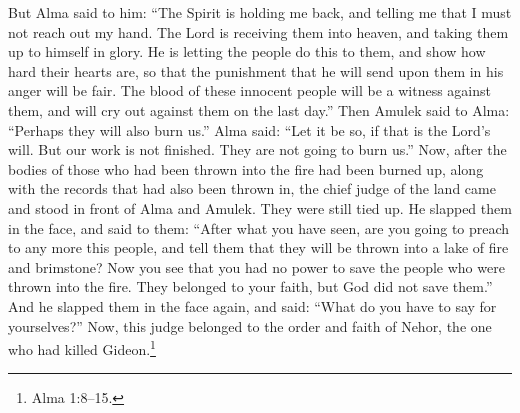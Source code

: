 But Alma said to him: ``The Spirit is holding me back, and telling me that I must not reach out my hand. The Lord is receiving them into heaven, and taking them up to himself in glory. He is letting the people do this to them, and show how hard their hearts are, so that the punishment that he will send upon them in his anger will be fair. The blood of these innocent people will be a witness against them, and will cry out against them on the last day.''
\bverse \iffalse Now Amulek said unto Alma: Behold, perhaps they will burn us also. \fi
Then Amulek said to Alma: ``Perhaps they will also burn us.''
\bverse \iffalse And Alma said: Be it according to the will of the Lord. But, behold, our work is not finished; therefore they burn us not. \fi
Alma said: ``Let it be so, if that is the Lord's will. But our work is not finished. They are not going to burn us.''
\bverse \iffalse Now it came to pass that when the bodies of those who had been cast into the fire were consumed, and also the records which were cast in with them, the chief judge of the land came and stood before Alma and Amulek, as they were bound; and he smote them with his hand upon their cheeks, and said unto them: After what ye have seen, will ye preach again unto this people, that they shall be cast into a lake of fire and brimstone? \fi
Now, after the bodies of those who had been thrown into the fire had been burned up, along with the records that had also been thrown in, the chief judge of the land came and stood in front of Alma and Amulek. They were still tied up. He slapped them in the face, and said to them: ``After what you have seen, are you going to preach to any more this people, and tell them that they will be thrown into a lake of fire and brimstone?
\bverse \iffalse Behold, ye see that ye had not power to save those who had been cast into the fire; neither has God saved them because they were of thy faith. And the judge smote them again upon their cheeks, and asked: What say ye for yourselves? \fi
Now you see that you had no power to save the people who were thrown into the fire. They belonged to your faith, but God did not save them.'' And he slapped them in the face again, and said: ``What do you have to say for yourselves?''
\bverse \iffalse Now this judge was after the order and faith of Nehor, who slew Gideon. \fi
Now, this judge belonged to the order and faith of Nehor, the one who had killed Gideon.\footnote{Alma 1:8--15.} 
\bverse \iffalse And it came to pass that Alma and Amulek answered him nothing; and he smote them again, and delivered them to the officers to be cast into prison. \fi
